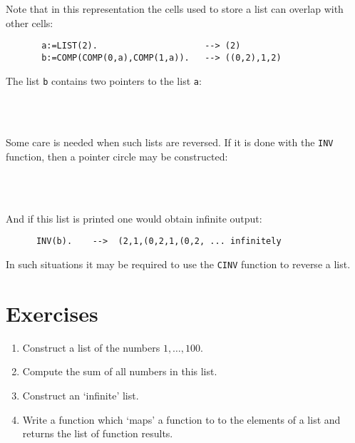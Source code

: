 Note that in this representation the cells used to
store a list can overlap with other cells:

\begin{verbatim}
       a:=LIST(2).                     --> (2)
       b:=COMP(COMP(0,a),COMP(1,a)).   --> ((0,2),1,2)
\end{verbatim}
The list \verb/b/ contains two pointers to 
the list \verb/a/:
\begin{center}
\cell{\ptr}{\ptr}                   \pcell{\arr}{}
               \pcell{\arr}{}
         \\
\pcell{$\downarrow$}{}              \pcell{}{} 
\pcell{}{}                          \pcell{}{}
\pcell{}{$\uparrow$}                \\
\pcell{\arr}{}                      \pcell{\arr}{}
\pcell{\arr}{}                      \pcell{$\cdot$}{}
\end{center}

Some care is needed when such lists are reversed.
If it is done with the \verb/INV/ function, then a 
pointer circle may be constructed:

\begin{center}
             \pcell{$\longleftarrow$}{}
               \pcell{$\longleftarrow$}{}
               \\
\pcell{$\downarrow$}{}              \pcell{}{} 
\pcell{}{}                          \pcell{}{}
\pcell{}{$\uparrow$}                \\
\pcell{\arr}{}                      \pcell{\arr}{}
\pcell{\arr}{}                      \pcell{$\cdot$}{}
\end{center}

And if this list is printed one would obtain infinite
output:
\begin{verbatim}
      INV(b).    -->  (2,1,(0,2,1,(0,2, ... infinitely
\end{verbatim}

In such situations it may be required to use
the \verb/CINV/ function to reverse a list.


\section{Exercises}

\begin{enumerate}
\item Construct a list of the numbers $1, \ldots, 100$.
\item Compute the sum of all numbers in this list.
\item Construct an `infinite' list.
\item Write a function which `maps' a function to 
      to the elements of a list and returns the
      list of function results. 
\end{enumerate}

